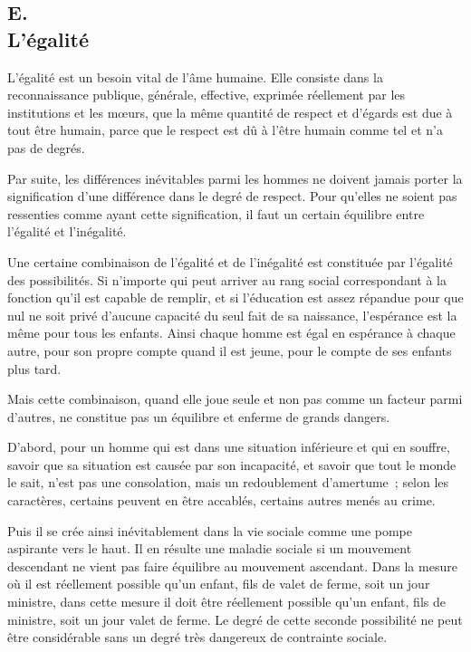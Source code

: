 \documentclass[french,twoside]{book} %
\begin{document}
\subsection[{E. L'égalité}]{E. \\
L'égalité}
\noindent \par
L'égalité est un besoin vital de l'âme humaine. Elle consiste dans la reconnaissance publique, générale, effective, exprimée réellement par les institutions et les mœurs, que la même quantité de respect et d'égards est due à tout être humain, parce que le respect est dû à l'être humain comme tel et n'a pas de degrés.\par
Par suite, les différences inévitables parmi les hommes ne doivent jamais porter la signification d'une différence dans le degré de respect. Pour qu'elles ne soient pas ressenties comme ayant cette signification, il faut un certain équilibre entre l'égalité et l'inégalité.\par
Une certaine combinaison de l'égalité et de l'inégalité est constituée par l'égalité des possibilités. Si n'importe qui peut arriver au rang social correspondant à la fonction qu'il est capable de remplir, et si l'éducation est assez répandue pour que nul ne soit privé d'aucune capacité du seul fait de sa naissance, l'espérance est la même pour tous les enfants. Ainsi chaque homme est égal en espérance à chaque autre, pour son propre compte quand il est jeune, pour le compte de ses enfants plus tard.\par
Mais cette combinaison, quand elle joue seule et non pas comme un facteur parmi d'autres, ne constitue pas un équilibre et enferme de grands dangers.\par
D'abord, pour un homme qui est dans une situation inférieure et qui en souffre, savoir que sa situation est causée par son incapacité, et savoir que tout le monde le sait, n'est pas une consolation, mais un redoublement d'amertume ; selon les caractères, certains peuvent en être accablés, certains autres menés au crime.\par
Puis il se crée ainsi inévitablement dans la vie sociale comme une pompe aspirante vers le haut. Il en résulte une maladie sociale si un mouvement descendant ne vient pas faire équilibre au mouvement ascendant. Dans la mesure où il est réellement possible qu'un enfant, fils de valet de ferme, soit un jour ministre, dans cette mesure il doit être réellement possible qu'un enfant, fils de ministre, soit un jour valet de ferme. Le degré de cette seconde possibilité ne peut être considérable sans un degré très dangereux de contrainte sociale.\par
\end{document}
